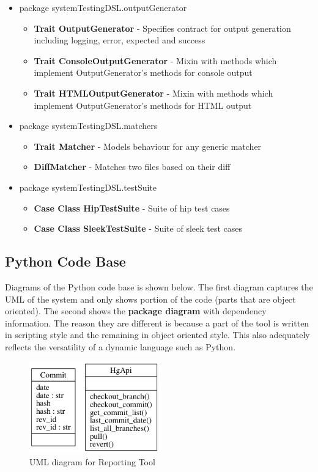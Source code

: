 \documentclass[12pt]{article}
\begin{document}
\begin{itemize}
\begin{itemize}
    \end{itemize}
\item package systemTestingDSL.outputGenerator
    \begin{itemize}
        \item \textbf{Trait OutputGenerator} - Specifies contract for output generation including logging, error, expected and success
        \item \textbf{Trait ConsoleOutputGenerator} - Mixin with methods which implement OutputGenerator's methods for console output
        \item \textbf{Trait HTMLOutputGenerator} - Mixin with methods which implement OutputGenerator's methods for HTML output
    \end{itemize}
\item package systemTestingDSL.matchers
    \begin{itemize}
    \item \textbf{Trait Matcher} - Models behaviour for any generic matcher
    \item \textbf{DiffMatcher} - Matches two files based on their diff
    \end{itemize}
\item package systemTestingDSL.testSuite
    \begin{itemize}
    \item \textbf{Case Class HipTestSuite} - Suite of hip test cases
    \item \textbf{Case Class SleekTestSuite} - Suite of sleek test cases
    \end{itemize}
\end{itemize}

\subsection{Python Code Base}
Diagrams of the Python code base is shown below. The first diagram captures the UML of the system and only shows portion of the code (parts that are object oriented). The second shows the \textbf{package diagram} with dependency information. The reason they are different is because a part of the tool is written in scripting style and the remaining in object oriented style. This also adequately reflects the versatility of a dynamic language such as Python.

\begin{figure}[H]
  \centering
    \includegraphics[height=150px]{figures/classes_reporting_tool.png}
  \caption{UML diagram for Reporting Tool}
\end{figure}
\end{document}
